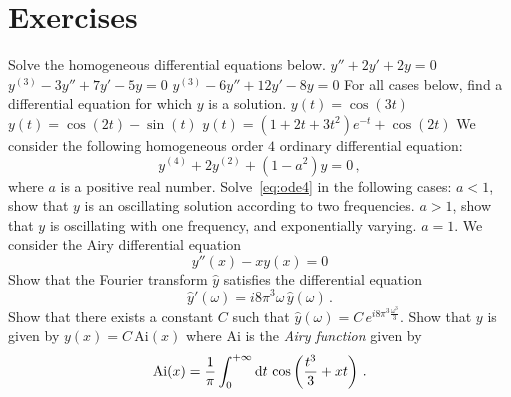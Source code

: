 \section{Exercises}
\begin{ExerciseList}
  \Exercise[label=ode-hom]
  Solve the homogeneous differential equations below.
  \Question $y''+2y'+2y=0$
  \Question $y^{(3)}-3y''+7y'-5y=0$
  \Question $y^{(3)}-6y''+12y'-8y=0$
  \Exercise[label=ode-rev]
  For all cases below, find a differential equation for which $y$ is a solution.
  \Question $y(t)=\cos(3t)$
  \Question $y(t)=\cos(2t)-\sin(t)$
  \Question $y(t)=(1+2t+3t^2)e^{-t}+\cos(2t)$
  \Exercise[label=ode4]
  We consider the following homogeneous order $4$ ordinary differential equation:
  \begin{equation}
    y^{(4)}+2y^{(2)}+(1-a^2)y=0\,,
    \label{eq:ode4}
  \end{equation}
  where $a$ is a positive real number.
  \Question Solve~\cref{eq:ode4} in the following cases:
  \subQuestion $a<1$, show that $y$ is an oscillating solution according
  to two frequencies.
  \subQuestion $a>1$, show that $y$ is oscillating with one frequency,
  and exponentially varying.
  \subQuestion $a=1$.
  \Exercise[label=airy]
  We consider the Airy differential equation
  \begin{equation}
    y''(x)-xy(x)=0
  \end{equation}
  \Question Show that the Fourier transform $\hat{y}$ satisfies the differential equation
  \begin{equation}
    \hat{y}'(\omega)=i8\pi^3\omega\,\hat{y}(\omega)\,.
  \end{equation}
  \Question Show that there exists a constant $C$ such that
  $\hat{y}(\omega)=C\,e^{i8\pi^3\frac{\omega^3}{3}}$.
  \Question Show that $y$ is given by $y(x)=C\,\mathrm{Ai}(x)$
  where $\mathrm{Ai}$ is the \emph{Airy function} given by
  \begin{equation}
    \mathrm{Ai}(x)=\frac{1}{\pi}\int_{0}^{+\infty}\mathrm{d} t\,\cos\left(\frac{t^3}{3}+xt\right)\,.
  \end{equation}

\end{ExerciseList}
